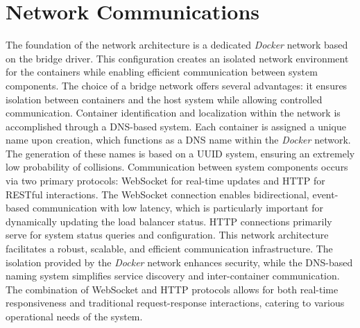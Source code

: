 \documentclass[twocolumn]{webofc}
\begin{document}
    \section{Network Communications}
    The foundation of the network architecture is a dedicated \textit{Docker} network based on the bridge driver. This configuration creates an isolated network environment for the containers while enabling efficient communication between system components. The choice of a bridge network offers several advantages: it ensures isolation between containers and the host system while allowing controlled communication\cite{docker_bridge_network}. Container identification and localization within the network is accomplished through a DNS-based system. Each container is assigned a unique name upon creation, which functions as a DNS name within the \textit{Docker} network. The generation of these names is based on a UUID system, ensuring an extremely low probability of collisions\cite{uuid}. Communication between system components occurs via two primary protocols: WebSocket for real-time updates and HTTP for RESTful interactions. The WebSocket connection enables bidirectional, event-based communication with low latency, which is particularly important for dynamically updating the load balancer status. HTTP connections primarily serve for system status queries and configuration. This network architecture facilitates a robust, scalable, and efficient communication infrastructure. The isolation provided by the \textit{Docker} network enhances security, while the DNS-based naming system simplifies service discovery and inter-container communication. The combination of WebSocket and HTTP protocols allows for both real-time responsiveness and traditional request-response interactions, catering to various operational needs of the system.
\end{document}
